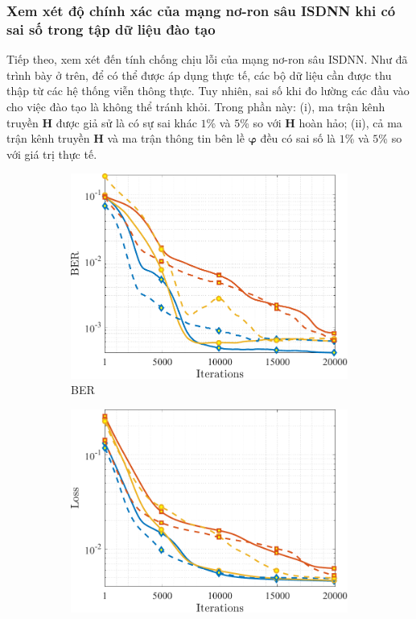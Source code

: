 \subsubsection{Xem xét độ chính xác của mạng nơ-ron sâu ISDNN khi có sai số trong tập dữ liệu đào tạo}
Tiếp theo, xem xét đến tính chống chịu lỗi của mạng nơ-ron sâu ISDNN. Như đã trình bày ở trên, để có thể được áp dụng thực tế, các bộ dữ liệu cần được thu thập từ các hệ thống viễn thông thực. Tuy nhiên, sai số khi đo lường các đầu vào cho việc đào tạo là không thể tránh khỏi. Trong phần này: (i), ma trận kênh truyền $\mathbf{H}$ được giả sử là có sự sai khác $1$\% và $5$\% so với $\mathbf{H}$ hoàn hảo; (ii), cả ma trận kênh truyền $\mathbf{H}$ và ma trận thông tin bên lề ${\boldsymbol{\varphi}}$ đều có sai số là $1$\% và $5$\% so với giá trị thực tế. 
\begin{figure}[ht]
    \centering
    \begin{subfigure}[b]{0.48\textwidth}
        \centering
        \includegraphics[width=\textwidth]{figures/BER_2.pdf}
        \caption{BER}
        \label{fig:ber_2}
    \end{subfigure}
    \hfill
    \begin{subfigure}[b]{0.48\textwidth}
        \centering
        \includegraphics[width=\textwidth]{figures/Loss_2.pdf}

\end{subfigure}
\end{figure}
